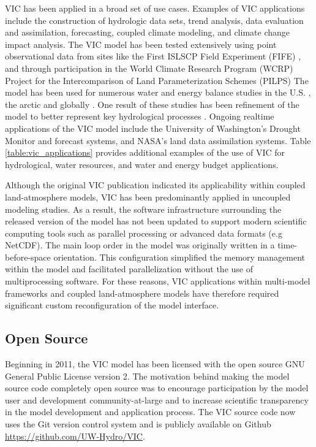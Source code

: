 \documentclass[gmd, manuscript]{copernicus}
\begin{document}
  VIC has been applied in a broad set of use cases.
  Examples of VIC applications include the construction of hydrologic data sets, trend analysis, data evaluation and assimilation, forecasting, coupled climate modeling, and climate change impact analysis.
  The VIC model has been tested extensively using point observational data from sites like the First ISLSCP Field Experiment (FIFE) \citep{Liang_1994}, and through participation in the World Climate Research Program (WCRP) Project for the Intercomparison of Land Parameterization Schemes (PILPS) \citep[.e.g.][]{Bowling_2003,wood_1998}
  The model has been used for numerous water and energy balance studies in the U.S. \citep{Abdulla_1997,Nijssen_1997}, the arctic \citep{Adam_2008,Su_2005,Tan_2011} and globally \citep{Nijssen_2001a,Nijssen_2001b,Nijssen_2001c,Sheffield_2009}.
  One result of these studies has been refinement of the model to better represent key hydrological processes \citep{Andreadis_2009,Cherkauer_2003,Liang_1996,Liang_1999}.
  Ongoing realtime applications of the VIC model include the University of Washington’s Drought Monitor and forecast systems, and NASA’s land data assimilation systems.
  Table \ref{table:vic_applications} provides additional examples of the use of VIC for hydrological, water resources, and water and energy budget applications.

  Although the original VIC publication indicated its applicability within coupled land-atmosphere models, VIC has been predominantly applied in uncoupled modeling studies.
  As a result, the software infrastructure surrounding the released version of the model has not been updated to support modern scientific computing tools such as parallel processing or advanced data formats (e.g NetCDF).
  The main loop order in the model was originally written in a time-before-space orientation.
  This configuration simplified the memory management within the model and facilitated parallelization without the use of multiprocessing software.
  For these reasons, VIC applications within multi-model frameworks \citep[e.g. NASA LIS][]{Kumar_2006} and coupled land-atmosphere models \citep[e.g. RASM][]{Hamman_2016a} have therefore required significant custom reconfiguration of the model interface.

  \subsection{Open Source}
    Beginning in 2011, the VIC model has been licensed with the open source GNU General Public License version 2.
    The motivation behind making the model source code completely open source was to encourage participation by the model user and development community-at-large and to increase scientific transparency in the model development and application process.
    The VIC source code now uses the Git version control system and is publicly available on Github \url{https://github.com/UW-Hydro/VIC}.
\end{document}
